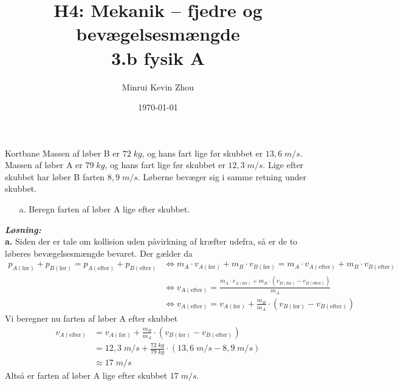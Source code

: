 \documentclass{report}
\title{H4: Mekanik – fjedre og bevægelsesmængde\\
{\Large \textbf{3.b fysik A}}}
\author{Minrui Kevin Zhou}
\date{\today}
\newcommand{\sol}{\setlength{\parindent}{0cm}\textbf{\textit{Løsning:}}\setlength{\parindent}{1cm}}
\begin{document}
\maketitle
\begin{question}{Kortbane}{}
Massen af løber B er $72 \;\unit{kg} $, og hans fart lige før skubbet er $13,6 \;\unit{m/s} $. 
  Massen af løber A er $79 \;\unit{kg} $, og hans fart lige før skubbet er $12,3 \;\unit{m/s} $. 
  Lige efter skubbet har løber B farten $8,9 \;\unit{m/s}$. 
  Løberne bevæger sig i samme retning under skubbet.
  \begin{itemize}
    \item[a.] Beregn farten af løber A lige efter skubbet.
  \end{itemize}
\end{question}
\sol \\
\textbf{a.}
Siden der er tale om kollision uden påvirkning af kræfter udefra, så er de to løberes bevægelsesmængde bevaret.
Der gælder da 
\begin{equation*}
\begin{split}
  p _{A (\text{før} )} + p _{B (\text{før} )}=p_{A (\text{efter} )} + p _{B (\text{efter} )} &\iff m _{A} \cdot v _{A (\text{før} )} + m _{B} \cdot v _{B (\text{før} )} = m _{A} \cdot v _{A (\text{efter} )} + m _{B} \cdot v _{B (\text{efter} )}\\
  &\iff v _{A (\text{efter}) }=\frac{m _{A} \cdot v _{A (\text{før} )}+ m _{B} \cdot \left(v _{B (\text{før} )}- v _{B (\text{efter} )}\right) }{m _{A}}\\
  &\iff v _{A (\text{efter}) }=v _{A (\text{før} )}+ \frac{m _{B} }{m _{A}} \cdot \left(v _{B (\text{før} )}- v _{B (\text{efter} )}\right) 
\end{split}
\end{equation*}
Vi beregner nu farten af løber A efter skubbet
\begin{equation*}
\begin{split}
  v _{A (\text{efter}) }&=v _{A (\text{før} )}+ \frac{m _{B}}{m _{A}} \cdot \left(v _{B (\text{før} )}- v _{B (\text{efter} )}\right) \\
  &=12,3 \;\unit{m/s} + \frac{72 \;\unit{kg} }{79 \;\unit{kg} } \cdot \left(13,6 \;\unit{m/s} - 8,9 \;\unit{m/s} \right) \\
  &\approx 17 \;\unit{m/s} 
\end{split}
\end{equation*}
Altså er farten af løber A lige efter skubbet $17 \;\unit{m/s} $.
\end{document}
